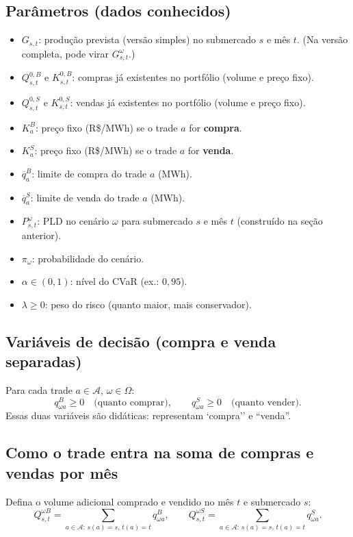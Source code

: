 \documentclass{article}
\begin{document}
\subsection{Parâmetros (dados conhecidos)}
\begin{itemize}
    \item $G_{s,t}$: produção prevista (versão simples) no submercado $s$ e mês $t$.
          (Na versão completa, pode virar $G^\omega_{s,t}$.)
    \item $Q^{0,B}_{s,t}$ e $K^{0,B}_{s,t}$: compras já existentes no portfólio (volume e preço fixo).
    \item $Q^{0,S}_{s,t}$ e $K^{0,S}_{s,t}$: vendas já existentes no portfólio (volume e preço fixo).
    \item $K_a^{B}$: preço fixo (R\$/MWh) se o trade $a$ for \textbf{compra}.
    \item $K_a^{S}$: preço fixo (R\$/MWh) se o trade $a$ for \textbf{venda}.
    \item $\overline{q}_a^{B}$: limite de compra do trade $a$ (MWh).
    \item $\overline{q}_a^{S}$: limite de venda do trade $a$ (MWh).
    \item $P^\omega_{s,t}$: PLD no cenário $\omega$ para submercado $s$ e mês $t$ (construído na seção anterior).
    \item $\pi_\omega$: probabilidade do cenário.
    \item $\alpha \in (0,1)$: nível do CVaR (ex.: $0{,}95$).
    \item $\lambda \ge 0$: peso do risco (quanto maior, mais conservador).
\end{itemize}

\subsection{Variáveis de decisão (compra e venda separadas)}
Para cada trade $a\in\mathcal{A}$, $\omega \in \Omega$:
\[
q_{\omega a}^{B} \ge 0 \quad \text{(quanto comprar)},
\qquad
q_{\omega a}^{S} \ge 0 \quad \text{(quanto vender)}.
\]
Essas duas variáveis são didáticas: representam `compra'' e ``venda''.

\subsection{Como o trade entra na soma de compras e vendas por mês}
Defina o volume adicional comprado e vendido no mês $t$ e submercado $s$:
\[
Q^{\omega B}_{s,t} = \sum_{a\in\mathcal{A}:\, s(a)=s,\, t(a)=t} q_{\omega a}^{B},
\qquad
Q^{\omega S}_{s,t} = \sum_{a\in\mathcal{A}:\, s(a)=s,\, t(a)=t} q_{\omega a}^{S}.
\]
\end{document}
